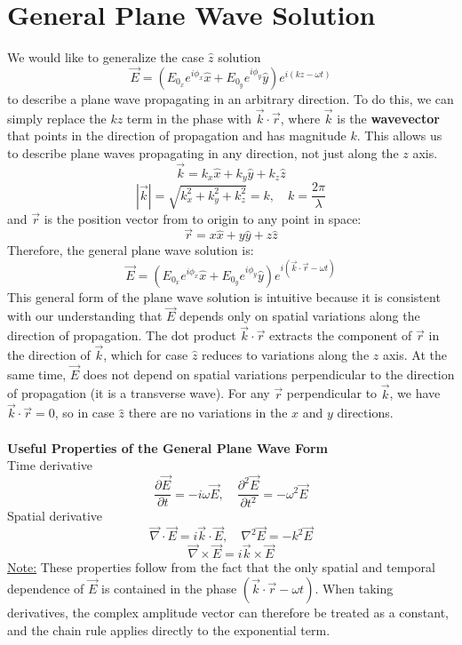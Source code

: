 \documentclass[12pt]{article}
\begin{document}
\section*{General Plane Wave Solution}
We would like to generalize the case $\hat{z}$ solution
\[\vec{E} = \left( E_{0_x} e^{i \phi_x} \hat{x} + E_{0_y} e^{i \phi_y} \hat{y} \right) e^{i (k z - \omega t)}\]
to describe a plane wave propagating in an arbitrary direction. To do this, we can simply replace the $kz$ term in the phase with $\vec{k}\cdot\vec{r}$, where $\vec{k}$ is the \textbf{wavevector} that points in the direction of propagation and has magnitude $k$. This allows us to describe plane waves propagating in any direction, not just along the $z$ axis.
\[\vec{k} = k_x \hat{x} + k_y \hat{y} + k_z \hat{z}\]
\[|\vec{k}| = \sqrt{k_x^2 + k_y^2 + k_z^2} = k,\quad k= \frac{2\pi}{\lambda}\]
and $\vec{r}$ is the position vector from to origin to any point in space:
\[\vec{r} = x \hat{x} + y \hat{y} + z \hat{z}\]
Therefore, the general plane wave solution is:
\[\boxed{\vec{E} = \left( E_{0_x} e^{i \phi_x} \hat{x} + E_{0_y} e^{i \phi_y} \hat{y} \right) e^{i (\vec{k}\cdot\vec{r} - \omega t)}}\]
This general form of the plane wave solution is intuitive because it is consistent with our understanding that $\vec{E}$ depends only on spatial variations along the direction of propagation. The dot product $\vec{k}\cdot\vec{r}$ extracts the component of $\vec{r}$ in the direction of $\vec{k}$, which for case $\hat{z}$ reduces to variations along the $z$ axis. At the same time, $\vec{E}$ does not depend on spatial variations perpendicular to the direction of propagation (it is a transverse wave). For any $\vec{r}$ perpendicular to $\vec{k}$, we have $\vec{k}\cdot\vec{r}=0$, so in case $\hat{z}$ there are no variations in the $x$ and $y$ directions.\\\\
\textbf{Useful Properties of the General Plane Wave Form}\\
Time derivative
\[\frac{\partial \vec{E}}{\partial t} = -i\omega \vec{E},\quad \frac{\partial^2\vec{E}}{\partial t^2} = -\omega^2 \vec{E}\]
Spatial derivative
\[\vec{\nabla} \cdot \vec{E} = i\vec{k} \cdot \vec{E},\quad \nabla^2 \vec{E} = -k^2 \vec{E}\]
\[\vec{\nabla} \times \vec{E} = i \vec{k} \times \vec{E}\]
\underline{Note:} These properties follow from the fact that the only spatial and temporal dependence of $\vec{E}$ is contained in the phase $(\vec{k}\cdot\vec{r}-\omega t)$. When taking derivatives, the complex amplitude vector can therefore be treated as a constant, and the chain rule applies directly to the exponential term.\\\\
\end{document}
